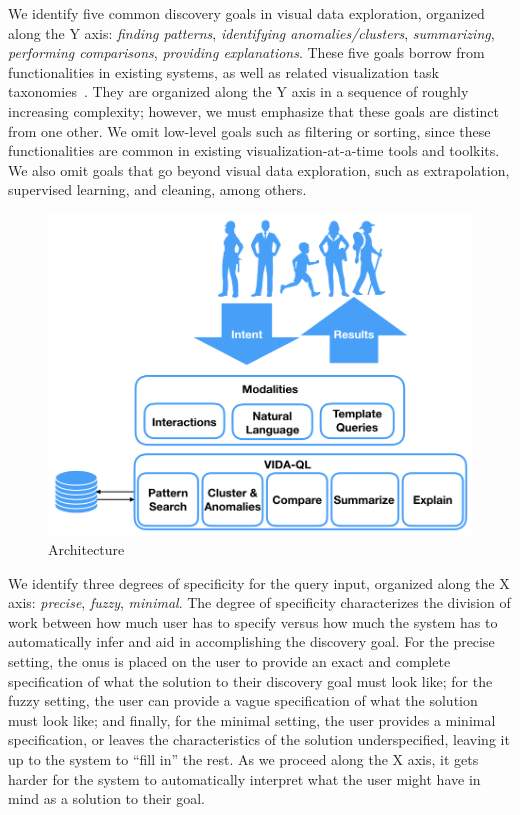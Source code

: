 \par
 We identify five 
common discovery goals in visual data exploration, organized
along the Y axis:
{\em finding patterns}, {\em identifying anomalies/clusters}, {\em summarizing}, 
{\em performing comparisons}, {\em providing explanations}.
These five goals borrow from functionalities in existing
systems, as well as related visualization task taxonomies~\cite{Amar2005,Heer2012}.
They are organized along the Y axis in a sequence of roughly increasing complexity; however, we must emphasize that these goals are distinct from one other. 
We omit low-level goals such as filtering or sorting, since these functionalities are common in existing visualization-at-a-time tools and toolkits. We also omit goals that go beyond visual data exploration, such as extrapolation, supervised learning, and cleaning, among others. 

\begin{figure}
\centering
\vspace{-15pt}
\includegraphics[width=\linewidth]{figures/VIDA_architecture.png}
\vspace{-25pt}
\caption{\vida Architecture\label{fig:vida_architecture}
\vspace{-15pt}
}
\end{figure}


\par 
 We identify three degrees of specificity
for the query input, organized along the X axis:
{\em precise}, {\em fuzzy}, {\em minimal}.
The degree of specificity characterizes the division
of work between how much user has to specify
versus how much the system has to automatically
infer and aid in accomplishing the discovery goal. 
For the precise setting, the onus is placed on the user
to provide an exact and complete specification of 
what the solution to their discovery
goal must look like;
for the fuzzy setting, the user can provide
a vague specification of what the solution must look like;
and finally, for the minimal setting,
the user provides a minimal specification, or
leaves the characteristics of the solution underspecified,
leaving it up to the system to ``fill in'' the rest.
As we proceed along the X axis,
it gets harder for the system to automatically
interpret what the user might have in mind as a solution
to their goal.


